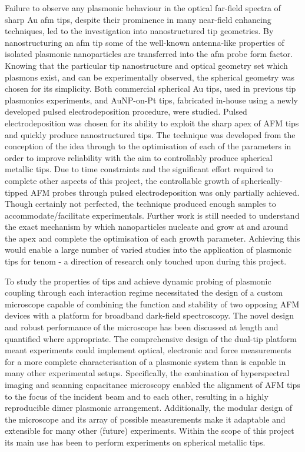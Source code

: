 \documentclass[12pt, a4paper, oneside]{book}
\begin{document}
Failure to observe any plasmonic behaviour in the optical far-field spectra of sharp Au \gls{afm} tips, despite their prominence in many near-field enhancing techniques, led to the investigation into nanostructured tip geometries. By nanostructuring an \gls{afm} tip some of the well-known antenna-like properties of isolated plasmonic nanoparticles are transferred into the \gls{afm} probe form factor. Knowing that the particular tip nanostructure and optical geometry set which plasmons exist, and can be experimentally observed, the spherical geometry was chosen for its simplicity. Both commercial spherical Au tips, used in previous tip plasmonics experiments, and AuNP-on-Pt tips, fabricated in-house using a newly developed pulsed electrodeposition procedure, were studied. Pulsed electrodeposition was chosen for its ability to exploit the sharp apex of AFM tips and quickly produce nanostructured tips. The technique was developed from the conception of the idea through to the optimisation of each of the parameters in order to improve reliability with the aim to controllably produce spherical metallic tips. Due to time constraints and the significant effort required to complete other aspects of this project, the controllable growth of spherically-tipped AFM probes through pulsed electrodeposition was only partially achieved. Though certainly not perfected, the technique produced enough samples to {\color{red}accommodate/facilitate} experimentals.
Further work is still needed to understand the exact mechanism by which nanoparticles nucleate and grow at and around the apex and complete the optimisation of each growth parameter. Achieving this would enable a large number of varied studies into the application of plasmonic tips for \gls{tenom} - a direction of research only touched upon during this project.

To study the properties of tips and achieve dynamic probing of plasmonic coupling through each interaction regime necessitated the design of a custom microscope capable of combining the function and stability of two opposing AFM devices with a platform for broadband dark-field spectroscopy. The novel design and robust performance of the microscope has been discussed at length and quantified where appropriate. The comprehensive design of the dual-tip platform meant experiments could implement optical, electronic and force measurements for a more complete characterisation of a plasmonic system than is capable in many other experimental setups. Specifically, the combination of hyperspectral imaging and scanning capacitance microscopy enabled the alignment of AFM tips to the focus of the incident beam and to each other, resulting in a highly reproducible dimer plasmonic arrangement. Additionally, the modular design of the microscope and its array of possible measurements make it adaptable and extensible for many other (future) experiments. Within the scope of this project its main use has been to perform experiments on spherical metallic tips.
\end{document}
